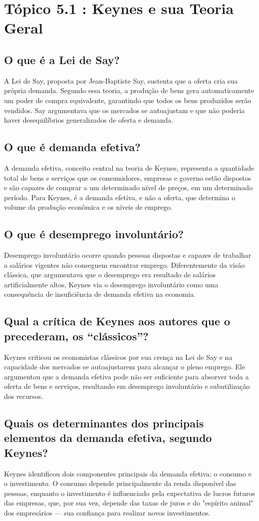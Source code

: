 \documentclass[12pt]{article}
\begin{document}
\section{\textbf{Tópico 5.1 : Keynes e sua Teoria Geral}}
\subsection{\textbf{O que é a Lei de Say?}}
A Lei de Say, proposta por Jean-Baptiste Say, sustenta que a oferta cria sua própria demanda. Segundo essa teoria, a produção de bens gera automaticamente um poder de compra equivalente, garantindo que todos os bens produzidos serão vendidos. Say argumentava que os mercados se autoajustam e que não poderia haver desequilíbrios generalizados de oferta e demanda.
\subsection{\textbf{O que é demanda efetiva?}}
A demanda efetiva, conceito central na teoria de Keynes, representa a quantidade total de bens e serviços que os consumidores, empresas e governo estão dispostos e são capazes de comprar a um determinado nível de preços, em um determinado período. Para Keynes, é a demanda efetiva, e não a oferta, que determina o volume da produção econômica e os níveis de emprego.
\subsection{\textbf{O que é desemprego involuntário?}}
Desemprego involuntário ocorre quando pessoas dispostas e capazes de trabalhar a salários vigentes não conseguem encontrar emprego. Diferentemente da visão clássica, que argumentava que o desemprego era resultado de salários artificialmente altos, Keynes via o desemprego involuntário como uma consequência de insuficiência de demanda efetiva na economia.
\subsection{\textbf{Qual a crítica de Keynes aos autores que o precederam, os “clássicos”?}}
Keynes criticou os economistas clássicos por sua crença na Lei de Say e na capacidade dos mercados se autoajustarem para alcançar o pleno emprego. Ele argumentou que a demanda efetiva pode não ser suficiente para absorver toda a oferta de bens e serviços, resultando em desemprego involuntário e subutilização dos recursos.
\subsection{\textbf{Quais os determinantes dos principais elementos da demanda efetiva, segundo Keynes?}}
Keynes identificou dois componentes principais da demanda efetiva: o consumo e o investimento. O consumo depende principalmente da renda disponível das pessoas, enquanto o investimento é influenciado pela expectativa de lucros futuros das empresas, que, por sua vez, depende das taxas de juros e do "espírito animal" dos empresários — sua confiança para realizar novos investimentos.
\end{document}
